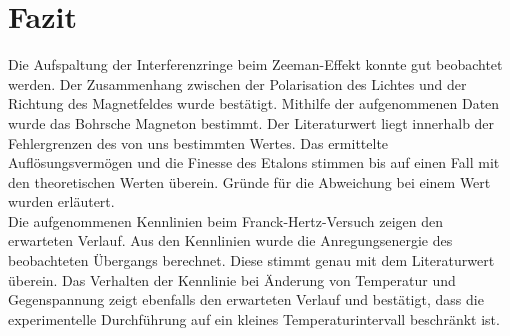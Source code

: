 \section{Fazit}
Die Aufspaltung der Interferenzringe beim Zeeman-Effekt konnte gut beobachtet werden. Der Zusammenhang zwischen der Polarisation des Lichtes und der Richtung des Magnetfeldes wurde bestätigt. Mithilfe der aufgenommenen Daten wurde das Bohrsche Magneton bestimmt. Der Literaturwert liegt innerhalb der Fehlergrenzen des von uns bestimmten Wertes. Das ermittelte Auflösungsvermögen und die Finesse des Etalons stimmen bis auf einen Fall mit den theoretischen Werten überein. Gründe für die Abweichung bei einem Wert wurden erläutert. \\ 
Die aufgenommenen Kennlinien beim Franck-Hertz-Versuch zeigen den erwarteten Verlauf. Aus den Kennlinien wurde die Anregungsenergie des beobachteten Übergangs berechnet. Diese stimmt genau mit dem Literaturwert überein. Das Verhalten der Kennlinie bei Änderung von Temperatur und Gegenspannung zeigt ebenfalls den erwarteten Verlauf und bestätigt, dass die experimentelle Durchführung auf ein kleines Temperaturintervall beschränkt ist.
